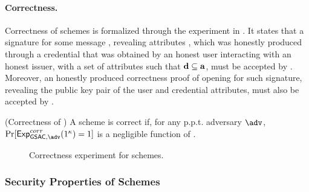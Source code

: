 \paragraph{Correctness.} %
Correctness of \GSAC schemes is formalized through the experiment in
. It states that a signature for some message \msg,
revealing attributes \dattrs, which was honestly produced through a credential
that was obtained by an honest user interacting with an honest issuer, with a
set of attributes \attrs such that $\mathbf{d} \subseteq \mathbf{a}$, must be accepted
by \Verify. Moreover, an honestly produced correctness proof of opening for such
signature, revealing the public key pair of the user and credential attributes,
must also be accepted by \Judge.

\begin{definition}{(Correctness of \GSAC)}
  \label{def:correctness-gsac}
  A \GSAC scheme is correct if, for any p.p.t. adversary $\adv$,
  $\Pr[\ExpGSACCorrect(1^\secpar) = 1]$ is a negligible function of \secpar.
\end{definition}

\begin{figure}[htp!]
  \caption{Correctness experiment for \GSAC schemes.}
  \label{fig:exp-gsac-corr}
\end{figure}

\subsubsection{Security Properties of \GSAC Schemes}
\label{sssec:security-gsac}

